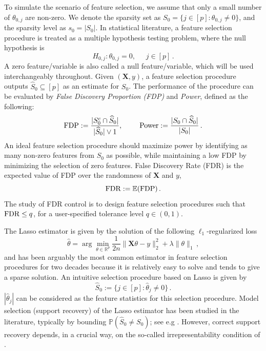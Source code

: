 \documentclass[11pt]{article}
\newcommand{\bX}{\boldsymbol{X}}
\newcommand{\mbR}{\mathbb{R}}
\newcommand{\FDP}{{\rm FDP}}
\newcommand{\FDR}{{\rm FDR}}
\newcommand{\Power}{{\rm Power}}
\newcommand{\Expected}{\mathbb{E}}
\newcommand{\hS}{\widehat{S}}
\newcommand{\hth}{\widehat{\theta}}
\begin{document}
To simulate the scenario of feature selection, we assume that only a small number of $\theta_{0,j}$ are non-zero. We denote the sparsity set as $S_0 = \{j\in[p]:\theta_{0,j}\neq 0\}$, and the sparsity level as $s_0 = |S_0|$. In statistical literature, a feature selection procedure is treated as a multiple hypothesis testing problem, where the null hypothesis is 
\[H_{0,j}:\theta_{0,j}=0,\phantom{sss}j\in[p]\,.\]
 A zero feature/variable is also called a null feature/variable, which will be used interchangeably throughout. Given $(\bX,y)$,  a feature selection procedure outputs $\hS_0\subseteq[p]$ as an estimate for $S_0$. The performance of the procedure can be evaluated by \emph{False Discovery Proportion (FDP)} and \emph{Power}, defined as the following:
\begin{equation}\label{eq:Power-FDP}
    \FDP := \frac{|S_0^c\cap\hS_0|}{|\hS_0|\vee 1}, \phantom{sssss}\Power := \frac{|S_0\cap\hS_0|}{|S_0|}\,.
\end{equation}
An ideal feature selection procedure should maximize power by identifying as many non-zero features from $S_0$ as possible, while maintaining a low FDP by minimizing the selection of zero features. False Discovery Rate (FDR) is the expected value of FDP over the randomness of $\bX$ and $y$,
\begin{equation}\label{eq:FDR}
    \FDR := \Expected(\FDP)\,.
\end{equation}
The study of FDR control is to design feature selection procedures such that $\FDR\leq q$, for a user-specified tolerance level $q\in(0,1)$.

The Lasso estimator is given by the solution of the following $\ell_1$-regularized loss 
\begin{equation}\label{eq:lasso-obj}
    \hth = \arg\min_{\theta\in\mbR^p}\frac{1}{2n}\|\bX \theta -y\|^2_2+\lambda\|\theta\|_1\,,
\end{equation}
and has been arguably the most common estimator in feature selection procedures for two decades because it is relatively easy to solve and tends to give a sparse solution. An intuitive selection procedure based on Lasso is given by
\[
\hS_0 := \{j\in[p]: \hth_j\neq 0\}\,.
\]
$|\hth_j|$ can be considered as the feature statistics for this selection procedure. 
Model selection (support recovery) of the Lasso estimator has been studied in the literature, typically by bounding $\mathbb{P}(\hS_0\neq S_0)$; see e.g \cite{zhao2006model,wainwright2009sharp,BulmannvandeGeer11,NIPS2013_a223c6b3}. However, correct support recovery depends, in a crucial way, on the so-called irrepresentability condition of \cite{zhao2006model}. 
 
\end{document}
